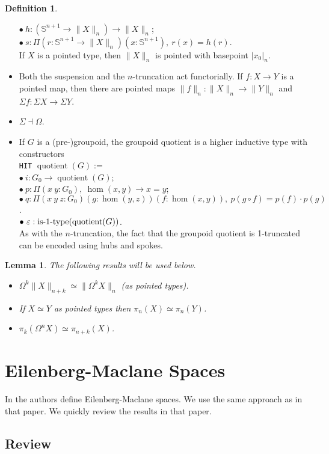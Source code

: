 \documentclass{article}
\newcommand{\fa}[2]{\ensuremath{\Pi(#1),\ #2}}
\newcommand{\fax}[2]{\ensuremath{\Pi#1,\ #2}}
\DeclareMathOperator{\homm}{hom}
\DeclareMathOperator{\quotient}{quotient}
\newcommand{\istrunc}[1]{\textnormal{is-}#1\textnormal{-type}}
\newcommand{\eps}{\ensuremath{\varepsilon}}
\newcommand{\sph}{\mathbb{S}}
\newtheorem{lemma}[theorem]{Lemma}
\theoremstyle{definition}
\newtheorem{definition}[theorem]{Definition}
\theoremstyle{remark}
\begin{document}
\begin{definition}
\begin{itemize}
    $\bullet\ h : (\sph^{n+1}\to\|X\|_n)\to\|X\|_n$; \\
    $\bullet\ s : \fax{(r : \sph^{n+1}\to\|X\|_n)(x : \sph^{n+1})}{r(x)=h(r)}$. \\
    If $X$ is a pointed type, then $\|X\|_n$ is pointed with basepoint $|x_0|_n$.
    \item Both the suspension and the $n$-truncation act functorially. If $f : X \to Y$ is a pointed
      map, then there are pointed maps $\|f\|_n : \|X\|_n \to \|Y\|_n$ and $\Sigma f : \Sigma X \to
      \Sigma Y$.
    \item $\Sigma \dashv \Omega$.
    \item If $G$ is a (pre-)groupoid, the groupoid quotient is a higher inductive type with
      constructors\\
    \texttt{HIT} $\quotient(G) :=$ \\
    $\bullet\ i : G_0 \to \quotient(G)$; \\
    $\bullet\ p : \fa{x\ y : G_0}{\homm(x,y)\to x=y}$; \\
    $\bullet\ q : \fax{(x\ y\ z : G_0)(g : \homm(y,z))(f : \homm(x,y))}
           {p(g \circ f) = p(f) \cdot p(g)}$. \\
    $\bullet\ \eps : \istrunc{1}(\quotient(G))$. \\
    As with the $n$-truncation, the fact that the groupoid quotient is 1-truncated can be encoded
    using hubs and spokes.
\end{itemize}
\end{definition}

\begin{lemma}
The following results will be used below.
\begin{itemize}
\item $\Omega^k\|X\|_{n+k}\simeq \|\Omega^k X\|_n$ (as pointed types).
\item If $X \simeq Y$ as pointed types then $\pi_n(X) \simeq \pi_n(Y)$.
\item $\pi_k(\Omega^n X)\simeq \pi_{n+k}(X)$.
\end{itemize}
\end{lemma}
\section{Eilenberg-Maclane Spaces}
In \cite{Licata2014EM} the authors define Eilenberg-Maclane spaces. We use the same approach as in
that paper. We quickly review the results in that paper.

\subsection{Review}
\end{document}
